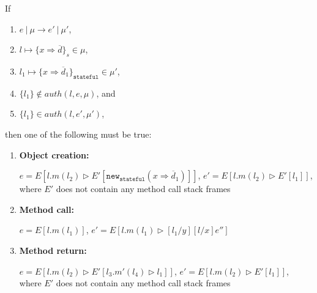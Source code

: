 \documentclass{llncs}
\newcommand{\keywadj}[1]{\mathtt{#1}}
\begin{document}
\begin{theorem} If
\begin{enumerate}
\item $e~|~\mu \longrightarrow e'~|~\mu'$,
\item $l \mapsto \{ x \Rightarrow \overline{d} \}_s \in \mu$,
\item $l_1 \mapsto \{ x \Rightarrow \overline{d}_1 \}_{\keywadj{stateful}} \in \mu'$,
\item $\{ l_1 \} \not\in auth(l, e, \mu)$, and
\item $\{ l_1 \} \in auth(l, e', \mu')$,
\end{enumerate}
then one of the following must be true:
\begin{enumerate}
\item \textbf{Object creation:}

$e = E[l.m(l_2) \rhd E'[\keywadj{new}_{\keywadj{stateful}}(x \Rightarrow \overline{d}_1)]]$, $e' = E[l.m(l_2) \rhd E'[l_1]]$, where $E'$ does not contain any method call stack frames

\item \textbf{Method call:}

$e = E[l.m(l_1)]$, $e' = E[l.m(l_1) \rhd [l_1/y][l/x]e'']$

\item \textbf{Method return:}

$e = E[l.m(l_2) \rhd E'[l_3.m'(l_4) \rhd l_1]]$, $e' = E[l.m(l_2) \rhd E'[l_1]]$, where $E'$ does not contain any method call stack frames
\end{enumerate}

\end{theorem}
\end{document}

